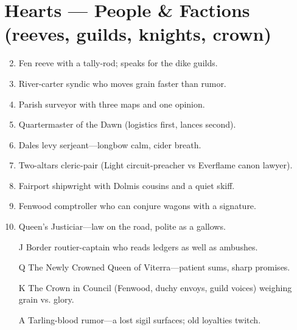 \section*{Hearts --- People \& Factions (reeves, guilds, knights, crown)}
\begin{enumerate}
\setcounter{enumi}{1}
\item Fen reeve with a tally-rod; speaks for the dike guilds.
\item River-carter syndic who moves grain faster than rumor.
\item Parish surveyor with three maps and one opinion.
\item Quartermaster of the Dawn (logistics first, lances second).
\item Dales levy serjeant---longbow calm, cider breath.
\item Two-altars cleric-pair (Light circuit-preacher vs Everflame canon lawyer).
\item Fairport shipwright with Dolmis cousins and a quiet skiff.
\item Fenwood comptroller who can conjure wagons with a signature.
\item Queen's Justiciar---law on the road, polite as a gallows.
\item[J] Border routier-captain who reads ledgers as well as ambushes.
\item[Q] The Newly Crowned Queen of Viterra---patient sums, sharp promises.
\item[K] The Crown in Council (Fenwood, duchy envoys, guild voices) weighing grain vs. glory.
\item[A] Tarling-blood rumor---a lost sigil surfaces; old loyalties twitch.
\end{enumerate}

